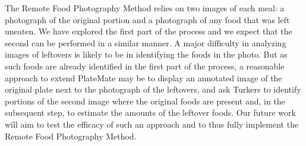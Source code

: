 The Remote Food Photography Method relies on two images of each meal:
a photograph of the original portion and a photograph of any food that was left
uneaten. We have explored the first part of the process and we expect
that the second can be performed in a similar manner.  A major difficulty in analyzing images of
leftovers is likely to be in identifying the foods in the photo. But
as such foods are already identified in the first part of the process, a reasonable approach to extend PlateMate may be to display an annotated
image of the original plate next to the photograph of the
leftovers, and ask Turkers to identify portions of the second image where the
original foods are present and, in the subsequent step, to estimate the
amounts of the leftover foods. Our future work will aim to test the efficacy
of such an approach and to thus fully implement the Remote Food Photography Method.

